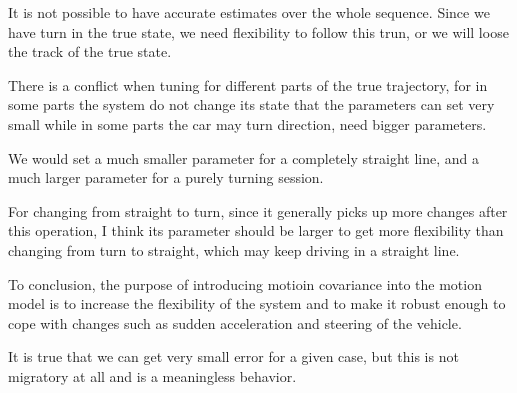 It is not possible to have accurate estimates over the whole sequence. Since we have turn in the true state, we need flexibility to follow this trun, or we will loose the track of the true state.


There is a conflict when tuning for different parts of the true trajectory, for in some parts the system do not change its state that the parameters can set very small while in some parts the car may turn direction, need bigger parameters.


We would set a much smaller parameter for a completely straight line, and a much larger parameter for a purely turning session.

For changing from straight to turn, since it generally picks up more changes after this operation, I think its parameter should be larger to get more flexibility than changing from turn to straight, which may keep driving in a straight line.

To conclusion, the purpose of introducing motioin covariance into the motion model is to increase the flexibility of the system and to make it robust enough to cope with changes such as sudden acceleration and steering of the vehicle.

It is true that we can get very small error for a given case, but this is not migratory at all and is a meaningless behavior.